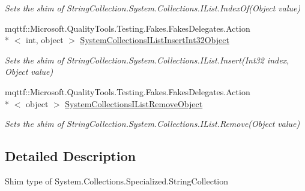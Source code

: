 \begin{DoxyCompactItemize}
\begin{DoxyCompactList}\small\item\em Sets the shim of String\-Collection.\-System.\-Collections.\-I\-List.\-Index\-Of(\-Object value)\end{DoxyCompactList}\item 
mqttf\-::\-Microsoft.\-Quality\-Tools.\-Testing.\-Fakes.\-Fakes\-Delegates.\-Action\\*
$<$ int, object $>$ \hyperlink{class_system_1_1_collections_1_1_specialized_1_1_fakes_1_1_shim_string_collection_af6eb6fec65c400f08587c688fc77c20f}{System\-Collections\-I\-List\-Insert\-Int32\-Object}
\begin{DoxyCompactList}\small\item\em Sets the shim of String\-Collection.\-System.\-Collections.\-I\-List.\-Insert(\-Int32 index, Object value)\end{DoxyCompactList}\item 
mqttf\-::\-Microsoft.\-Quality\-Tools.\-Testing.\-Fakes.\-Fakes\-Delegates.\-Action\\*
$<$ object $>$ \hyperlink{class_system_1_1_collections_1_1_specialized_1_1_fakes_1_1_shim_string_collection_ad5b3585857151e6f8ba771ca54ff3176}{System\-Collections\-I\-List\-Remove\-Object}
\begin{DoxyCompactList}\small\item\em Sets the shim of String\-Collection.\-System.\-Collections.\-I\-List.\-Remove(\-Object value)\end{DoxyCompactList}\end{DoxyCompactItemize}


\subsection{Detailed Description}
Shim type of System.\-Collections.\-Specialized.\-String\-Collection



